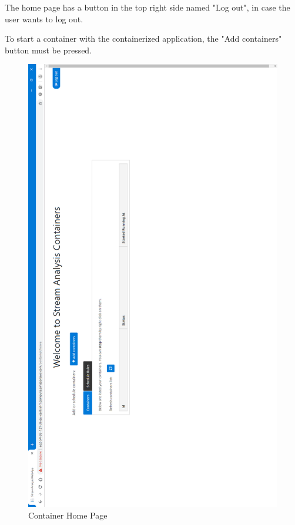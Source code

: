 The home page has a button in the top right side named "Log out", in case the user wants to log out.

To start a container with the containerized application, the "Add containers" button must be pressed.\\

\begin{figure}[p]
	\centering
	\noindent
	\includegraphics[width=0.5\paperwidth]{./images/guide/container/home.PNG}
	\caption{Container Home Page}
	\label{fig:containerHome}
\end{figure}

